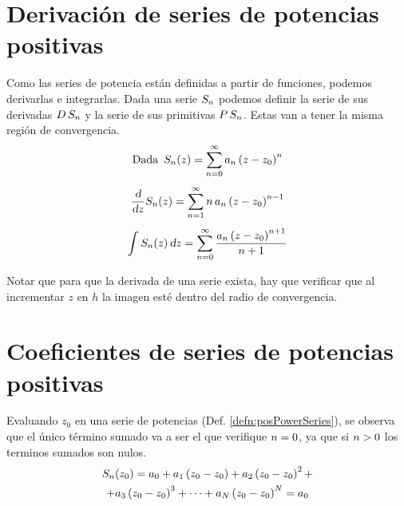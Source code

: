 \documentclass[a5paper,12pt,twoside]{book}
\begin{document}
\section{Derivación de series de potencias positivas}

Como las series de potencia están definidas a partir de funciones, podemos derivarlas e integrarlas. Dada una serie $S_n$ podemos definir la serie de sus derivadas $D \, S_n$ y la serie de sus primitivas $P \, S_n$. Estas van a tener la misma región de convergencia.
\begin{gather*}
    \textrm{Dada} \enspace S_n(z) = \sum_{n=0}^\infty a_n \left(z-z_0\right)^n
    \\[1ex]
    \frac{\textsl{d}}{\textsl{d} z} S_n(z) = \sum_{n=1}^\infty n \, a_n \left(z-z_0\right)^{n-1}
    \\[1ex]
    \int S_n(z) \, \textsl{d} z = \sum_{n=0}^\infty \frac{a_n \left(z-z_0\right)^{n+1}}{n+1}
\end{gather*}

Notar que para que la derivada de una serie exista, hay que verificar que al incrementar $z$ en $h$ la imagen esté dentro del radio de convergencia.


\section{Coeficientes de series de potencias positivas}

Evaluando $z_0$ en una serie de potencias (Def. \ref{defn:posPowerSeries}), se observa que el único término sumado va a ser el que verifique $n=0$, ya que si $n>0$ los terminos sumados son nulos.
\begin{multline*}
    S_n(z_0) = a_0 + a_1 \left(z_0-z_0\right) + a_2 \left(z_0-z_0\right)^2 +
    \\
    + a_3 \left(z_0-z_0\right)^3 + \dots + a_N \left(z_0-z_0\right)^N = a_0
\end{multline*}
\end{document}
